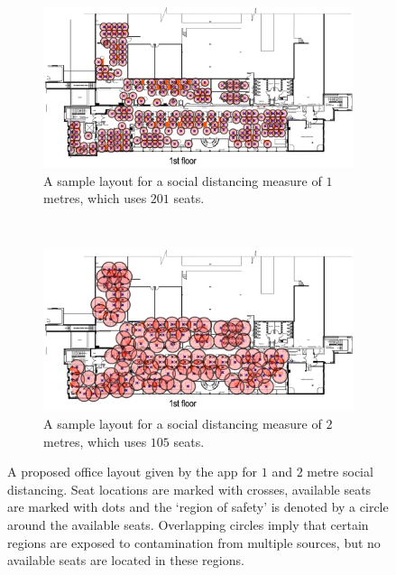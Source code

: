 \documentclass[11pt,a4paper]{article}
\begin{document}
\begin{figure}[ht!]
\centering

\begin{subfigure}[h]{0.9\linewidth}
\centering
\includegraphics[width = \linewidth]{1m_overlay.png}
\caption{A sample layout for a social distancing measure of $1$ metres, which uses $201$ seats.}
\label{OneMetre}
\end{subfigure}
~
\begin{subfigure}[h]{0.9\linewidth}
\centering
\includegraphics[width = \linewidth]{2m_overlay.png}
\caption{A sample layout for a social distancing measure of $2$ metres, which uses $105$ seats.}
\label{TwoMetre}
\end{subfigure}
\caption{A proposed office layout given by the app for $1$ and $2$ metre social distancing. Seat locations are marked with crosses, available seats are marked with dots and the `region of safety' is denoted by a circle around the available seats. Overlapping circles imply that certain regions are exposed to contamination from multiple sources, but no available seats are located in these regions. }
\label{Demonstration_pics}
\end{figure}

\newpage
\end{document}
